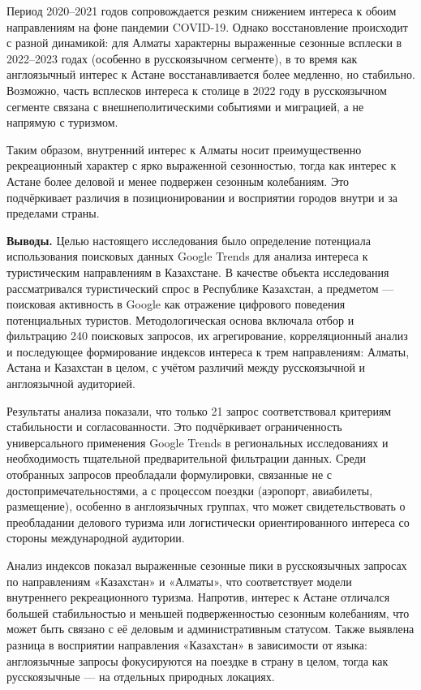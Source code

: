 \begin{multicols}{2}
Период 2020--2021 годов сопровождается резким снижением интереса к обоим
направлениям на фоне пандемии COVID-19. Однако восстановление происходит
с разной динамикой: для Алматы характерны выраженные сезонные всплески в
2022--2023 годах (особенно в русскоязычном сегменте), в то время как
англоязычный интерес к Астане восстанавливается более медленно, но
стабильно. Возможно, часть всплесков интереса к столице в 2022 году в
русскоязычном сегменте связана с внешнеполитическими событиями и
миграцией, а не напрямую с туризмом.

Таким образом, внутренний интерес к Алматы носит преимущественно
рекреационный характер с ярко выраженной сезонностью, тогда как интерес
к Астане более деловой и менее подвержен сезонным колебаниям. Это
подчёркивает различия в позиционировании и восприятии городов внутри и
за пределами страны.

{\bfseries Выводы.} Целью настоящего исследования было определение
потенциала использования поисковых данных Google Trends для анализа
интереса к туристическим направлениям в Казахстане. В качестве объекта
исследования рассматривался туристический спрос в Республике Казахстан,
а предметом --- поисковая активность в Google как отражение цифрового
поведения потенциальных туристов. Методологическая основа включала отбор
и фильтрацию 240 поисковых запросов, их агрегирование, корреляционный
анализ и последующее формирование индексов интереса к трем направлениям:
Алматы, Астана и Казахстан в целом, с учётом различий между
русскоязычной и англоязычной аудиторией.

Результаты анализа показали, что только 21 запрос соответствовал
критериям стабильности и согласованности. Это подчёркивает
ограниченность универсального применения Google Trends в региональных
исследованиях и необходимость тщательной предварительной фильтрации
данных. Среди отобранных запросов преобладали формулировки, связанные не
с достопримечательностями, а с процессом поездки (аэропорт, авиабилеты,
размещение), особенно в англоязычных группах, что может
свидетельствовать о преобладании делового туризма или логистически
ориентированного интереса со стороны международной аудитории.

Анализ индексов показал выраженные сезонные пики в русскоязычных
запросах по направлениям «Казахстан» и «Алматы», что соответствует
модели внутреннего рекреационного туризма. Напротив, интерес к Астане
отличался большей стабильностью и меньшей подверженностью сезонным
колебаниям, что может быть связано с её деловым и административным
статусом. Также выявлена разница в восприятии направления «Казахстан» в
зависимости от языка: англоязычные запросы фокусируются на поездке в
страну в целом, тогда как русскоязычные --- на отдельных природных
локациях.


\end{multicols}
